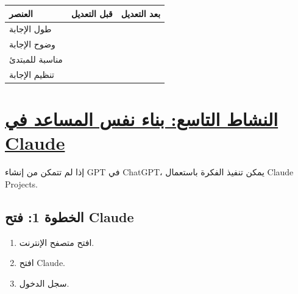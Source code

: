 \documentclass[a4paper]{article}
\begin{document}
\begin{center}

\begin{tabular}{|
>{\raggedleft\arraybackslash}m{5cm}|
>{\raggedleft\arraybackslash}m{4cm}|
>{\raggedleft\arraybackslash}m{4cm}|}

\hline

\textbf{العنصر}
&
\textbf{قبل التعديل}
&
\textbf{بعد التعديل}
\\

\hline

طول الإجابة
&
&
\\[0.8cm]

\hline

وضوح الإجابة
&
&
\\[0.8cm]

\hline

مناسبة للمبتدئ
&
&
\\[0.8cm]

\hline

تنظيم الإجابة
&
&
\\[0.8cm]

\hline

\end{tabular}

\end{center}



\section*{\khatt\underline{النشاط التاسع: بناء نفس المساعد في Claude}}

إذا لم تتمكن من إنشاء GPT في ChatGPT،
يمكن تنفيذ الفكرة باستعمال
\textenglish{Claude Projects}.



\subsection*{\khatt الخطوة 1: فتح Claude}

\begin{enumerate}

    \item افتح متصفح الإنترنت.

    \item افتح \textenglish{Claude}.

    \item سجل الدخول.

\end{enumerate}
\end{document}
